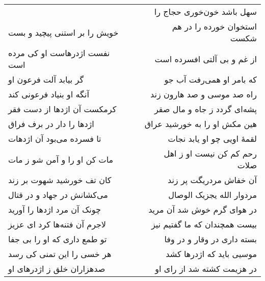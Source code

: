 \begin{center}
\begin{longtable}{l p{0.5cm} r}
&&
سهل باشد خون‌خوری حجاج را
\\
خویش را بر استنی پیچید و بست
&&
استخوان خورده را در هم شکست
\\
نفست اژدرهاست او کی مرده است
&&
از غم و بی آلتی افسرده است
\\
گر بیابد آلت فرعون او
&&
که بامر او همی‌رفت آب جو
\\
آنگه او بنیاد فرعونی کند
&&
راه صد موسی و صد هارون زند
\\
کرمکست آن اژدها از دست فقر
&&
پشه‌ای گردد ز جاه و مال صقر
\\
اژدها را دار در برف فراق
&&
هین مکش او را به خورشید عراق
\\
تا فسرده می‌بود آن اژدهات
&&
لقمهٔ اویی چو او یابد نجات
\\
مات کن او را و آمن شو ز مات
&&
رحم کم کن نیست او ز اهل صلات
\\
کان تف خورشید شهوت بر زند
&&
آن خفاش مردریگت پر زند
\\
می‌کشانش در جهاد و در قتال
&&
مردوار الله یجزیک الوصال
\\
چونک آن مرد اژدها را آورید
&&
در هوای گرم خوش شد آن مرید
\\
لاجرم آن فتنه‌ها کرد ای عزیز
&&
بیست همچندان که ما گفتیم نیز
\\
تو طمع داری که او را بی جفا
&&
بسته داری در وقار و در وفا
\\
هر خسی را این تمنی کی رسد
&&
موسیی باید که اژدرها کشد
\\
صدهزاران خلق ز اژدرهای او
&&
در هزیمت کشته شد از رای او
\\
\end{longtable}
\end{center}
